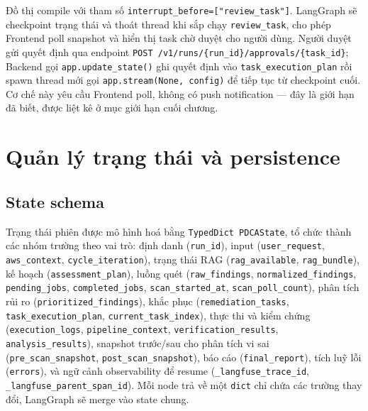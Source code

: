 Đồ thị compile với tham số \texttt{interrupt\_before=["review\_task"]}. LangGraph sẽ checkpoint trạng thái và thoát thread khi sắp chạy \texttt{review\_task}, cho phép Frontend poll snapshot và hiển thị task chờ duyệt cho người dùng. Người duyệt gửi quyết định qua endpoint \texttt{POST /v1/runs/\{run\_id\}/approvals/\{task\_id\}}; Backend gọi \texttt{app.update\_state()} ghi quyết định vào \texttt{task\_execution\_plan} rồi spawn thread mới gọi \texttt{app.stream(None, config)} để tiếp tục từ checkpoint cuối. Cơ chế này yêu cầu Frontend poll, không có push notification — đây là giới hạn đã biết, được liệt kê ở mục giới hạn cuối chương.



\section{Quản lý trạng thái và persistence}
\label{sec:state_impl}

\subsection{State schema}

Trạng thái phiên được mô hình hoá bằng \texttt{TypedDict PDCAState}, tổ chức thành các nhóm trường theo vai trò: định danh (\texttt{run\_id}), input (\texttt{user\_request}, \texttt{aws\_context}, \texttt{cycle\_iteration}), trạng thái RAG (\texttt{rag\_available}, \texttt{rag\_bundle}), kế hoạch (\texttt{assessment\_plan}), luồng quét (\texttt{raw\_findings}, \texttt{normalized\_findings}, \texttt{pending\_jobs}, \texttt{completed\_jobs}, \texttt{scan\_started\_at}, \texttt{scan\_poll\_count}), phân tích rủi ro (\texttt{prioritized\_findings}), khắc phục (\texttt{remediation\_tasks}, \texttt{task\_execution\_plan}, \texttt{current\_task\_index}), thực thi và kiểm chứng (\texttt{execution\_logs}, \texttt{pipeline\_context}, \texttt{verification\_results}, \texttt{analysis\_results}), snapshot trước/sau cho phân tích vi sai (\texttt{pre\_scan\_snapshot}, \texttt{post\_scan\_snapshot}), báo cáo (\texttt{final\_report}), tích luỹ lỗi (\texttt{errors}), và ngữ cảnh observability để resume (\texttt{\_langfuse\_trace\_id}, \texttt{\_langfuse\_parent\_span\_id}). Mỗi node trả về một \texttt{dict} chỉ chứa các trường thay đổi, LangGraph sẽ merge vào state chung.

